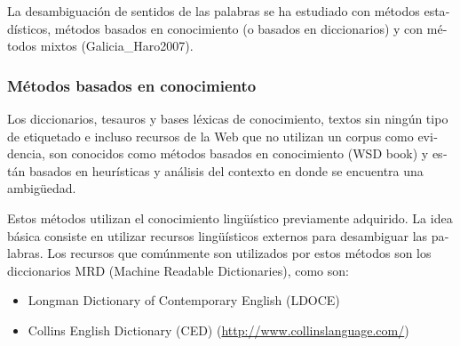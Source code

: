 \documentclass[letterpaper]{article}
\newcommand\textstylebibuscitbase[1]{#1}
\newcommand\liststyleLxi{%
\renewcommand\labelitemi{{\textbullet}}
\renewcommand\labelitemii{${\circ}$}
\renewcommand\labelitemiii{${\blacksquare}$}
\renewcommand\labelitemiv{{\textbullet}}
}
\begin{document}
\bigskip

{\sffamily
\textstylebibuscitbase{\foreignlanguage{spanish}{La desambiguaci\'on de
sentidos de las palabras se ha estudiado con m\'etodos estad\'isticos,
m\'etodos basados en conocimiento (o basados en diccionarios) y con
m\'etodos mixtos
}}\textstylebibuscitbase{\foreignlanguage{spanish}{(Galicia\_Haro2007)}}\textstylebibuscitbase{\foreignlanguage{spanish}{.}}}


\bigskip

\subsubsection[M\'etodos basados en
conocimiento]{\textstylebibuscitbase{\foreignlanguage{spanish}{M\'etodos
basados en conocimiento}}}
\hypertarget{RefHeading4008985831413}{}
\bigskip

{\sffamily
\textstylebibuscitbase{\foreignlanguage{spanish}{Los diccionarios,
tesauros y bases l\'exicas de conocimiento, textos sin ning\'un tipo de
etiquetado e incluso recursos de la Web que no utilizan un corpus como
}}\textstylebibuscitbase{\foreignlanguage{spanish}{evidencia, son
conocidos como m\'etodos basados en conocimiento (WSD book) y est\'an
basados en heur\'isticas y an\'alisis del contexto en donde se
encuentra }}\textstylebibuscitbase{\foreignlanguage{spanish}{una
ambig\"uedad.}}}


\bigskip

{\sffamily
\textstylebibuscitbase{\foreignlanguage{spanish}{Estos m\'etodos
utilizan el conocimiento ling\"u\'istico previamente adquirido. La idea
b\'asica consiste en utilizar recursos ling\"u\'isticos externos para
desambiguar }}\textstylebibuscitbase{\foreignlanguage{spanish}{las
palabras. Los recursos que com\'unmente son utilizados por estos
m\'etodos }}\textstylebibuscitbase{\foreignlanguage{spanish}{son los
diccionarios MRD (Machine Readable Dictionaries), como son:}}}


\bigskip

\liststyleLxi
\begin{itemize}
\item {\sffamily
Longman Dictionary of Contemporary English (LDOCE) }
\item {\sffamily
\foreignlanguage{spanish}{Collins English Dictionary (CED)
(}\url{http://www.collinslanguage.com/}\foreignlanguage{spanish}{) }}
\end{itemize}
\end{document}
